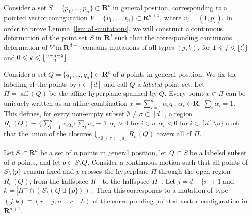 \documentclass[a4paper,USenglish,cleveref, autoref, thm-restate,nolineno]{socg-lipics-v2021}
\DeclareMathOperator{\aff}{aff}
\renewcommand{\leq}{\leqslant}
\newcommand{\R}{\mathbf{R}}
\DeclarePairedDelimiter\floor{\lfloor}{\rfloor}
\begin{document}
Consider a set $S = \{p_1,\dots,p_n \}\subset \R^d$ in general position, corresponding to a pointed vector configuration $V = \{v_1,\dots,v_n\} \subset \R^{d+1}$, where $v_i=(1, p_i)$. 
In order to prove Lemma~\ref{lem:all-mutations}, we will construct a continuous deformation of the point set $S$ in $\R^d$ such that the corresponding continuous deformation of $V$ in $\R^{d+1}$ contains mutations of all types $(j,k)$, for  $1 \leq j \leq \floor{\frac{d}{2}}$ and $0 \leq k \leq \floor{\frac{n-d-2}{2}}$. 

Consider a set $Q=\{q_1,\dots,q_d\}\subset \R^d$ of $d$ points in general position. We fix the labeling of the points by $i\in [d]$ and call $Q$ a \emph{labeled} point set.
Let $\Pi=\aff(Q)$ be the affine hyperplane spanned by $Q$. Every point $x\in \Pi$ can be uniquely written as an affine combination $x=\sum_{i=1}^d \alpha_i q_i$, $\alpha_i \in \R$, $\sum_i \alpha_i =1$. This defines, for every non-empty subset 
$\emptyset \neq \sigma \subset [d]$, a region  $R_\sigma(Q)=\{\sum_{i=1}^d \alpha_i q_i \colon \sum_i \alpha_i =1, \alpha_i >0 \textrm{ for } i\in \sigma, \alpha_i<0 \textrm{ for } i\in [d]\setminus \sigma\}$ such that the union of the closures 
$\bigcup_{\emptyset \neq \sigma \subset [d]} \overline{R_\sigma(Q)}$ covers all of $\Pi$.

\begin{observation}
\label{obs:point-mutation}
Let $S \subset \R^d$ be a set of $n$ points in general position, let $Q\subset S$ be a labeled subset of $d$ points, and let $p\in S\setminus Q$. Consider a continuous motion such that all points of $S\setminus \{p\}$ remain fixed and $p$ crosses the hyperplane $\Pi$ through the open region $R_{\sigma}(Q)$, from the halfspace $\Pi^-$ to the halfspace $\Pi^+$. Let $j=d-|\sigma|+1$ and $k=|\Pi^+ \cap (S\setminus (Q \sqcup \{p\}))|$. Then this corresponds to a mutation of type $(j,k)\equiv (r-j,n-r-k)$ of the corresponding pointed vector  configuration in $\R^{d+1}$.
\end{observation}
\end{document}
